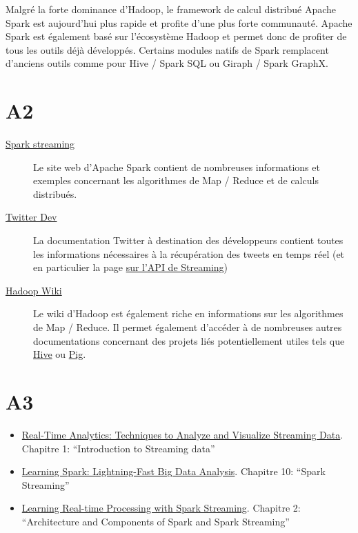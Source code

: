     Malgré la forte dominance d'Hadoop, le framework de calcul distribué Apache Spark est aujourd'hui plus rapide et profite d'une plus forte communauté. Apache Spark est également basé sur l'écosystème Hadoop et permet donc de profiter de tous les outils déjà développés. Certains modules natifs de Spark remplacent d'anciens outils comme pour Hive / Spark SQL ou Giraph / Spark GraphX.


\section{A2}
  \begin{description}
    \item[\href{http://spark.apache.org/streaming/}{Spark streaming}] Le site web d'Apache Spark contient de nombreuses informations et exemples concernant les algorithmes de Map / Reduce et de calculs distribués.
    \item[\href{https://dev.twitter.com}{Twitter Dev}] La documentation Twitter à destination des développeurs contient toutes les informations nécessaires à la récupération des tweets en temps réel (et en particulier la page \href{https://dev.twitter.com/streaming/overview}{sur l'API de Streaming})
    \item[\href{http://wiki.apache.org/hadoop}{Hadoop Wiki}] Le wiki d'Hadoop est également riche en informations sur les algorithmes de Map / Reduce. Il permet également d'accéder à de nombreuses autres documentations concernant des projets liés potentiellement utiles tels que \href{https://cwiki.apache.org/confluence/display/Hive/Home}{Hive} ou \href{https://cwiki.apache.org/confluence/display/PIG/Index}{Pig}.
  \end{description}

\section{A3}
  \begin{itemize}
    \item \href{http://www.amazon.fr/Real-Time-Analytics-Techniques-Visualize-Streaming/dp/1118837916/ref=sr_1_7?s=english-books&ie=UTF8&qid=1446301986&sr=1-7&keywords=streaming}{Real-Time Analytics: Techniques to Analyze and Visualize Streaming Data}. Chapitre 1: ``Introduction to Streaming data''
    \item \href{http://www.amazon.com/Learning-Spark-Lightning-Fast-Data-Analysis/dp/1449358624/ref=sr_1_1?ie=UTF8&qid=1446301706&sr=8-1&keywords=apache+spark}{Learning Spark: Lightning-Fast Big Data Analysis}. Chapitre 10: ``Spark Streaming''
    \item \href{http://www.amazon.fr/Learning-Real-time-Processing-Spark-Streaming-ebook/dp/B015Q7I3NM/ref=sr_1_2?s=english-books&ie=UTF8&qid=1446301986&sr=1-2&keywords=streaming}{Learning Real-time Processing with Spark Streaming}. Chapitre 2: ``Architecture and Components of Spark and Spark Streaming''
  \end{itemize}

